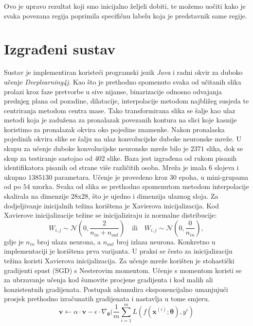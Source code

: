 \documentclass[times, utf8, diplomski]{fer}
\theoremstyle{definition}
\begin{document}
Ovo je upravo rezultat koji smo inicijalno željeli dobiti, te možemo uočiti kako je svaka povezana regija poprimila specifičnu labelu koja je predstavnik same regije.

\chapter{Izgrađeni sustav}
Sustav je implementiran koristeći programski jezik \textit{Java} i radni okvir za duboko učenje \textit{Deeplearning4j}. Kao što je prethodno spomenuto svaka od učitanih slika prolazi kroz faze pretvorbe u sive nijanse, binarizacije odnosno odvajanja prednjeg plana od pozadine, dilatacije, interpolacije metodom najbližeg susjeda te centriranja metodom centra mase. Tako transformirana slika se šalje kao ulaz metodi koja je zadužena za pronalazak povezanih kontura na slici koje kasnije koristimo za pronalazak okvira oko pojedine znamenke. Nakon pronalaska pojedinih okvira slike se šalju na ulaz konvolucijske duboke neuronske mreže. U skupu za učenje duboke konvolucijske neuronske mreže bilo je $2371$ slika, dok se skup za testiranje sastojao od $402$ slike. Baza jest izgrađena od rukom pisanih identifikatora pisanih od strane više različitih osoba. Mreža je imala $6$ slojeva i ukupno $1385130$ parametara. Učenje je provedeno kroz $30$ epoha, u mini-grupama  od po $54$ uzorka. Svaka od slika se prethodno spomenutom metodom interpolacije skalirala na dimenzije 28x28, što je ujedno i dimenzija ulaznog sloja. Za dodjeljivanje inicijalnih težina korištena je Xavierova inicijalizacija. Kod Xavierove inicijalizacije težine se inicijaliziraju iz normalne distribucije:
\begin{equation}
W_{i, j} \sim \mathcal{N}(0, \frac{2}{n_{in} + n_{out}})\quad \textrm{ili} \quad W_{i, j} \sim \mathcal{N}(0, \frac{0}{n_{in}}),
\end{equation}
gdje je $n_{in}$ broj ulaza neurona, a $n_{out}$ broj izlaza neurona. Konkretno u implementaciji je korištena prva varijanta. U praksi se često za inicijalizaciju težina koristi Xavierova inicijalizacija.
Za učenje mreže korišten je stohastički gradijenti spust  (SGD) s Nesterovim momentom. Učenje s momentom koristi se za ubrzavanje učenja kod šumovite procjene gradijenta i kod malih ali konzistentnih gradijenata. Postupak akumulira eksponencijalno umanjujući prosjek prethodno izračunatih gradijenata i nastavlja u tome smjeru.
\begin{equation}
\bm{v} \leftarrow \alpha \cdot \bm{v} - \epsilon \cdot \nabla_{\bm{\theta}}(\frac{1}{m} \sum_{i=1}^{m}L(f(\bm{x}^{(i)}; \bm{\theta}), y^i )
\end{equation}
\end{document}
